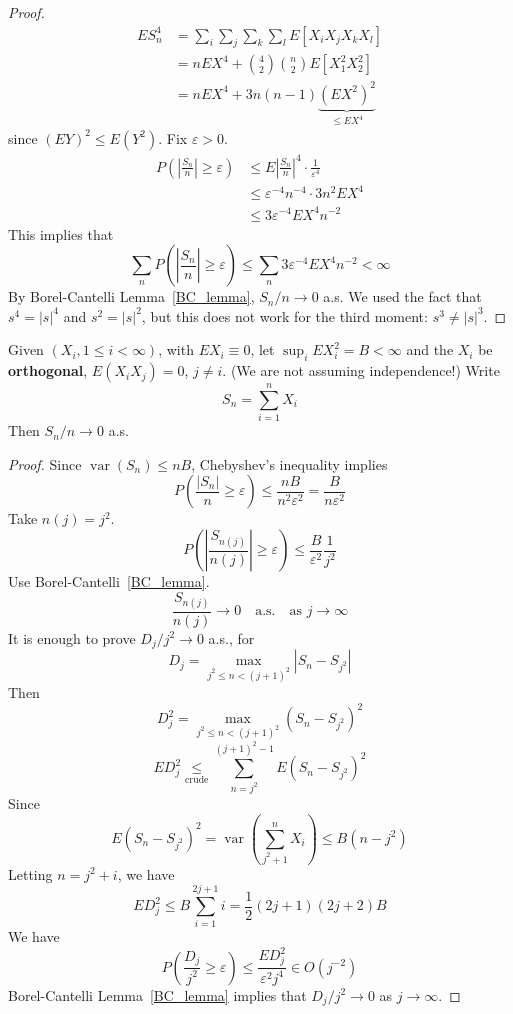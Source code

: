 \begin{proof}
    \begin{align*}
    ES_n^4 &=\sum_i \sum_j \sum_k \sum_l E[X_i X_j X_k X_l]\\
    &= nEX^4 + \binom{4}{2}\binom{n}{2} E[X_1^2 X_2^2] \\
    &= nEX^4 + 3n(n-1) \underbrace{(EX^2)^2}_{\leq EX^4}
    \end{align*}
    since $(EY)^2 \leq E(Y^2)$.
 Fix $\varepsilon > 0$.
    \begin{align*}
    P\left(\left|\frac{S_n}{n}\right| \geq \varepsilon\right) &\leq E\left|\frac{S_n}{n}\right|^4 \cdot \frac{1}{\varepsilon^4} \\
    &\leq \varepsilon^{-4} n^{-4} \cdot 3n^2 EX^4 \\
    &\leq 3\varepsilon^{-4} EX^4 n^{-2}
    \end{align*}
    This implies that
    \[
    \sum_n P\left(\left|\frac{S_n}{n}\right| \geq \varepsilon\right) \leq \sum_n 3\varepsilon^{-4} EX^4 n^{-2} < \infty
    \]
    By Borel-Cantelli Lemma~\ref{BC_lemma}, $S_n/n \to 0$ a.s. We used the fact that $s^4 = |s|^4$ and $s^2 = |s|^2$, but this does not work for the third moment: $s^3 \neq |s|^3$.
\end{proof}

\begin{thm}
Given $(X_i, 1 \leq i < \infty)$, with $EX_i \equiv 0$, let $\sup_i EX_i^2 = B < \infty$ and the $X_i$ be \textbf{orthogonal}, $E(X_i X_j) = 0$, $j \neq i$. (We are not assuming independence!) Write
\[
S_n = \sum_{i=1}^{n} X_i
\]
Then $S_n/n \to 0$ a.s.
\end{thm}

\begin{proof}
Since $\operatorname{var}(S_n) \leq nB$, Chebyshev's inequality implies
\[
P\left(\frac{|S_n|}{n} \geq \varepsilon\right) \leq \frac{nB}{n^2 \varepsilon^2} = \frac{B}{n\varepsilon^2}
\]
Take $n(j) = j^2$.
\[
P\left(\left|\frac{S_{n(j)}}{n(j)}\right| \geq \varepsilon\right) \leq \frac{B}{\varepsilon^2} \frac{1}{j^2}
\]
Use Borel-Cantelli~\ref{BC_lemma}.
\[
\frac{S_{n(j)}}{n(j)} \to 0 \quad \text{a.s.} \quad \text{as } j \to \infty
\]
It is enough to prove $D_j / j^2 \to 0$ a.s., for
\[
D_j = \max_{j^2 \leq n < (j+1)^2} |S_n - S_{j^2}|
\]
Then
\[
D_j^2 = \max_{j^2 \leq n < (j+1)^2} (S_n - S_{j^2})^2
\]
\[
ED_j^2 \underset{\text{crude}}{\leq} \sum_{n=j^2}^{(j+1)^2 - 1} E(S_n - S_{j^2})^2
\]
Since
\[
E(S_n - S_{j^2})^2 = \operatorname{var}\left(\sum_{j^2+1}^{n} X_i\right) \leq B(n - j^2)
\]
Letting $n = j^2 + i$, we have
\[
ED_j^2 \leq B \sum_{i=1}^{2j+1} i = \frac{1}{2}(2j+1)(2j+2)B
\]
We have
\[
P\left(\frac{D_j}{j^2} \geq \varepsilon\right) \leq \frac{ED_j^2}{\varepsilon^2 j^4} \in O(j^{-2})
\]
Borel-Cantelli Lemma~\ref{BC_lemma} implies that $D_j / j^2 \to 0$ as $j \to \infty$.
\end{proof}

